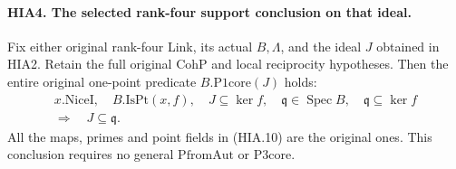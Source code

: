 \paragraph{HIA4. The selected rank-four support conclusion on that ideal.}
\label{claim:HIA4}
Fix either original rank-four Link, its actual \(B,\Lambda\),
and the ideal \(J\) obtained in HIA2.  Retain the full
original \(\mathrm{CohP}\) and local reciprocity hypotheses.
Then the entire original one-point predicate
\(B.\mathrm{P1core}(J)\) holds:
\[
 \begin{gathered}
 x.\mathrm{NiceI},\quad B.\mathrm{IsPt}(x,f),\quad
 J\subseteq\ker f,\quad
 \mathfrak q\in\operatorname{Spec}B,\quad
 \mathfrak q\subseteq\ker f\\
                       \Longrightarrow\quad J\subseteq\mathfrak q.
 \end{gathered}
 \tag{HIA.10}
\]
All the maps, primes and point fields in (HIA.10) are the
original ones.  This conclusion requires no general
\(\mathrm{PfromAut}\) or \(\mathrm{P3core}\).
